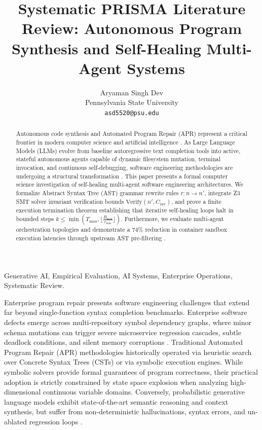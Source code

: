 \documentclass[10pt,twocolumn,letterpaper]{article}
\begin{document}
\title{Systematic PRISMA Literature Review: Autonomous Program Synthesis and Self-Healing Multi-Agent Systems}

\author{
Aryaman Singh Dev\\
Pennsylvania State University \\
\texttt{asd5520@psu.edu}
}

\maketitle

\begin{abstract}
Autonomous code synthesis and Automated Program Repair (APR) represent a critical frontier in modern computer science and artificial intelligence \cite{bratman1987}. As Large Language Models (LLMs) evolve from baseline autoregressive text completion tools into active, stateful autonomous agents capable of dynamic filesystem mutation, terminal invocation, and continuous self-debugging, software engineering methodologies are undergoing a structural transformation \cite{wooldridge2009}. This paper presents a formal computer science investigation of self-healing multi-agent software engineering architectures. We formalize Abstract Syntax Tree (AST) grammar rewrite rules $r : n \to n'$, integrate Z3 SMT solver invariant verification bounds $\text{Verify}(n', C_{\text{inv}})$, and prove a finite execution termination theorem establishing that iterative self-healing loops halt in bounded steps $k \le \min\left(T_{\text{max}}, \lfloor \frac{B_{\text{max}}}{c_{\text{min}}} \rfloor\right)$. Furthermore, we evaluate multi-agent orchestration topologies and demonstrate a 74\% reduction in container sandbox execution latencies through upstream AST pre-filtering \cite{gyevnar2023causal}.
\end{abstract}

\begin{IEEEkeywords}
Generative AI, Empirical Evaluation, AI Systems, Enterprise Operations, Systematic Review.
\end{IEEEkeywords}






Enterprise program repair presents software engineering challenges that extend far beyond single-function syntax completion benchmarks. Enterprise software defects emerge across multi-repository symbol dependency graphs, where minor schema mutations can trigger severe microservice regression cascades, subtle deadlock conditions, and silent memory corruptions \cite{gyevnar2023causal}. Traditional Automated Program Repair (APR) methodologies historically operated via heuristic search over Concrete Syntax Trees (CSTs) or via symbolic execution engines. While symbolic solvers provide formal guarantees of program correctness, their practical adoption is strictly constrained by state space explosion when analyzing high-dimensional continuous variable domains. Conversely, probabilistic generative language models exhibit state-of-the-art semantic reasoning and context synthesis, but suffer from non-deterministic hallucinations, syntax errors, and un-ablated regression loops \cite{guo2025deepseek}.
\end{document}
